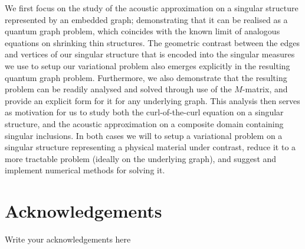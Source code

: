 \documentclass[a4paper]{report}
\begin{document}
We first focus on the study of the acoustic approximation on a singular structure represented by an embedded graph; demonstrating that it can be realised as a quantum graph problem, which coincides with the known limit of analogous equations on shrinking thin structures.
The geometric contrast between the edges and vertices of our singular structure that is encoded into the singular measures we use to setup our variational problem also emerges explicitly in the resulting quantum graph problem.
Furthermore, we also demonstrate that the resulting problem can be readily analysed and solved through use of the $M$-matrix, and provide an explicit form for it for any underlying graph.
This analysis then serves as motivation for us to study both the curl-of-the-curl equation on a singular structure, and the acoustic approximation on a composite domain containing singular inclusions.
In both cases we will to setup a variational problem on a singular structure representing a physical material under contrast, reduce it to a more tractable problem (ideally on the underlying graph), and suggest and implement numerical methods for solving it.


\chapter*{Acknowledgements}
Write your acknowledgements here

\tableofcontents

\cleardoublepage %
\listoffigures %

\cleardoublepage
{}











\newpage


\end{document}

